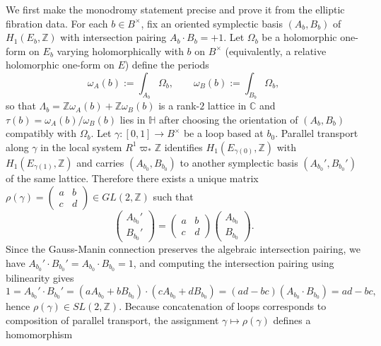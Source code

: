 \documentclass[11pt]{article}
\theoremstyle{remark}
\begin{document}
We first make the monodromy statement precise and prove it from the elliptic fibration data. For each $b\in B^\times$, fix an oriented symplectic basis $(A_b,B_b)$ of $H_1(E_b,\mathbb{Z})$ with intersection pairing $A_b\cdot B_b=+1$. Let $\Omega_b$ be a holomorphic one-form on $E_b$ varying holomorphically with $b$ on $B^\times$ (equivalently, a relative holomorphic one-form on $E$) define the periods
\begin{equation}\label{eq:periods_def}
\omega_A(b):=\int_{A_b}\Omega_b,\qquad \omega_B(b):=\int_{B_b}\Omega_b,
\end{equation}
so that $\Lambda_b=\mathbb{Z}\omega_A(b)+\mathbb{Z}\omega_B(b)$ is a rank-$2$ lattice in $\mathbb{C}$ and $\tau(b)=\omega_A(b)/\omega_B(b)$ lies in $\mathbb{H}$ after choosing the orientation of $(A_b,B_b)$ compatibly with $\Omega_b$. Let $\gamma:[0,1]\to B^\times$ be a loop based at $b_0$. Parallel transport along $\gamma$ in the local system $R^1\varpi_\ast\mathbb{Z}$ identifies $H_1(E_{\gamma(0)},\mathbb{Z})$ with $H_1(E_{\gamma(1)},\mathbb{Z})$ and carries $(A_{b_0},B_{b_0})$ to another symplectic basis $(A_{b_0}',B_{b_0}')$ of the same lattice. Therefore there exists a unique matrix $\rho(\gamma)=\begin{pmatrix}a&b\\ c&d\end{pmatrix}\in GL(2,\mathbb{Z})$ such that
\begin{equation}\label{eq:cycle_transport}
\begin{pmatrix}A_{b_0}'\\ B_{b_0}'\end{pmatrix}=\begin{pmatrix}a&b\\ c&d\end{pmatrix}\begin{pmatrix}A_{b_0}\\ B_{b_0}\end{pmatrix}.
\end{equation}
Since the Gauss-Manin connection preserves the algebraic intersection pairing, we have $A_{b_0}'\cdot B_{b_0}'=A_{b_0}\cdot B_{b_0}=1$, and computing the intersection pairing using bilinearity gives
\begin{equation}\label{eq:det_one}
1=A_{b_0}'\cdot B_{b_0}'=(aA_{b_0}+bB_{b_0})\cdot(cA_{b_0}+dB_{b_0})=(ad-bc)(A_{b_0}\cdot B_{b_0})=ad-bc,
\end{equation}
hence $\rho(\gamma)\in SL(2,\mathbb{Z})$. Because concatenation of loops corresponds to composition of parallel transport, the assignment $\gamma\mapsto\rho(\gamma)$ defines a homomorphism
\end{document}
